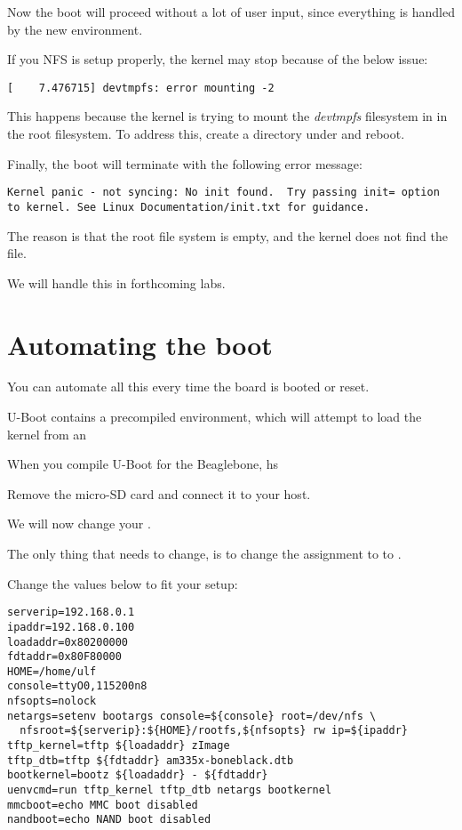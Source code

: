 Now the boot will proceed without a lot of user input, since everything is
handled by the new environment.

If you NFS is setup properly, the kernel may stop because of the below issue:

\begin{verbatim}
[    7.476715] devtmpfs: error mounting -2
\end{verbatim}

This happens because the kernel is trying to mount the {\em devtmpfs}
filesystem in  in the root filesystem. To address this,
create a  directory under  and reboot.

Finally, the boot will terminate with the following error message:

\begin{verbatim}
Kernel panic - not syncing: No init found.  Try passing init= option to kernel. See Linux Documentation/init.txt for guidance. 
\end{verbatim}

The reason is that the root file system is empty, and the kernel does not find the  file.

We will handle this in forthcoming labs.
\clearpage
\section{Automating the boot}

You can automate all this every time the board is booted or reset. 

U-Boot contains a precompiled environment, which will attempt to load
the kernel from an 



When you compile  U-Boot for the Beaglebone, hs




Remove the micro-SD card and connect it to your host.

We will now change your .

The only thing that needs to change, is to change
the assignment to  to .

Change the values below to fit your setup:

\begin{verbatim}
serverip=192.168.0.1
ipaddr=192.168.0.100
loadaddr=0x80200000
fdtaddr=0x80F80000
HOME=/home/ulf
console=ttyO0,115200n8
nfsopts=nolock
netargs=setenv bootargs console=${console} root=/dev/nfs \
  nfsroot=${serverip}:${HOME}/rootfs,${nfsopts} rw ip=${ipaddr}
tftp_kernel=tftp ${loadaddr} zImage
tftp_dtb=tftp ${fdtaddr} am335x-boneblack.dtb
bootkernel=bootz ${loadaddr} - ${fdtaddr}
uenvcmd=run tftp_kernel tftp_dtb netargs bootkernel
mmcboot=echo MMC boot disabled
nandboot=echo NAND boot disabled
\end{verbatim}

